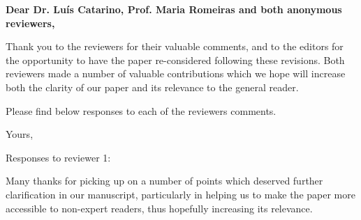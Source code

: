 \documentclass[a4paper]{letter}
\begin{document}



\begin{letter}{} %


	\opening{\textbf{Dear Dr. Lu\'{i}s Catarino, Prof. Maria Romeiras and both anonymous reviewers,}}
 
Thank you to the reviewers for their valuable comments, and to the editors for the opportunity to have the paper re-considered following these revisions. Both reviewers made a number of valuable contributions which we hope will increase both the clarity of our paper and its relevance to the general reader. 

Please find below responses to each of the reviewers comments.

\vspace{\parskip} %
\closing{Yours,}
\vspace{2\parskip} %


\newpage{}
Responses to reviewer 1:

Many thanks for picking up on a number of points which deserved further clarification in our manuscript, particularly in helping us to make the paper more accessible to non-expert readers, thus hopefully increasing its relevance.


\end{letter}
\end{document}
